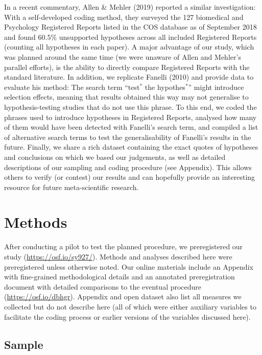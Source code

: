 \documentclass[british,,jou,floatsintext]{apa6}
\begin{document}
In a recent commentary, Allen \& Mehler (2019) reported a similar investigation:
With a self-developed coding method, they surveyed the 127 biomedical and Psychology Registered Reports listed in the COS database as of September 2018 and found \(60.5\%\) unsupported hypotheses across all included Registered Reports (counting all hypotheses in each paper).
A major advantage of our study, which was planned around the same time (we were unaware of Allen and Mehler's parallel efforts), is the ability to directly compare Registered Reports with the standard literature.
In addition, we replicate Fanelli (2010) and provide data to evaluate his method: The search term \enquote{test\(^\ast\) the hypothes\(^\ast\)} might introduce selection effects, meaning that results obtained this way may not generalise to hypothesis-testing studies that do not use this phrase.
To this end, we coded the phrases used to introduce hypotheses in Registered Reports, analysed how many of them would have been detected with Fanelli's search term, and compiled a list of alternative search terms to test the generalisability of Fanelli's results in the future.
Finally, we share a rich dataset containing the exact quotes of hypotheses and conclusions on which we based our judgements, as well as detailed descriptions of our sampling and coding procedure (see Appendix).
This allows others to verify (or contest) our results and can hopefully provide an interesting resource for future meta-scientific research.

\hypertarget{methods}{%
\section{Methods}\label{methods}}

After conducting a pilot to test the planned procedure, we preregistered our study (\url{https://osf.io/sy927/}).
Methods and analyses described here were preregistered unless otherwise noted.
Our online materials include an Appendix with fine-grained methodological details and an annotated preregistration document with detailed comparisons to the eventual procedure (\url{https://osf.io/dbhgr}).
Appendix and open dataset also list all measures we collected but do not describe here (all of which were either auxiliary variables to facilitate the coding process or earlier versions of the variables discussed here).

\hypertarget{sample}{%
\subsection{Sample}\label{sample}}
\end{document}
